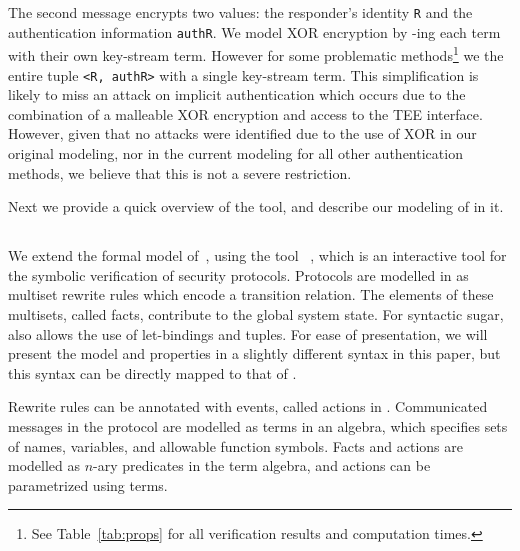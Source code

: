 \documentclass[runningheads]{llncs}
\begin{document}
The second message encrypts two values: the responder's 
identity
\verb|R| and the authentication information \verb|authR|.
%
We model XOR encryption by \mXor-ing each term with their own key-stream 
term.
%
However for some problematic methods\footnote{See Table~\ref{tab:props} for all verification results and computation times.} we \mXor{} the entire tuple
\verb|<R, authR>| with a single key-stream term.
%
This simplification is likely to miss an attack on implicit authentication which occurs due to the combination of a malleable XOR encryption and access to the TEE 
interface.
%
However, given that no attacks were identified due to the use of XOR in our original modeling, nor in the current modeling for all other authentication methods, we believe that this is not a severe restriction.
%

Next we provide a quick overview of the \mTamarin{} tool, and describe our modeling of \mEdhoc{} in it.
%

\subsection{\mTamarin{}}
\label{sec:tamarin}
We extend the formal \mEdhoc{} model of~\cite{Norr21}, using the tool \mTamarin{}~\cite{DBLP:conf/cav/MeierSCB13}, which is an 
interactive
tool for the symbolic verification of security protocols.
%
Protocols are modelled in \mTamarin{} as multiset rewrite rules which encode 
a
transition relation.
%
The elements of these multisets, called facts, contribute to the global
system state.
%
For syntactic sugar, \mTamarin{} also allows the use of let-bindings and tuples.
%
For ease of presentation, we will present the model and properties in a
slightly different syntax in this paper, but this syntax can be directly
mapped to that of \mTamarin.
%

Rewrite rules can be annotated with events, called actions in \mTamarin{}.
%
Communicated messages in the protocol are modelled as terms in an algebra,
which specifies sets of names, variables, and allowable function symbols.
%
Facts and actions are modelled as $n$-ary predicates in the term algebra,
and actions can be parametrized using terms.
%
\end{document}
